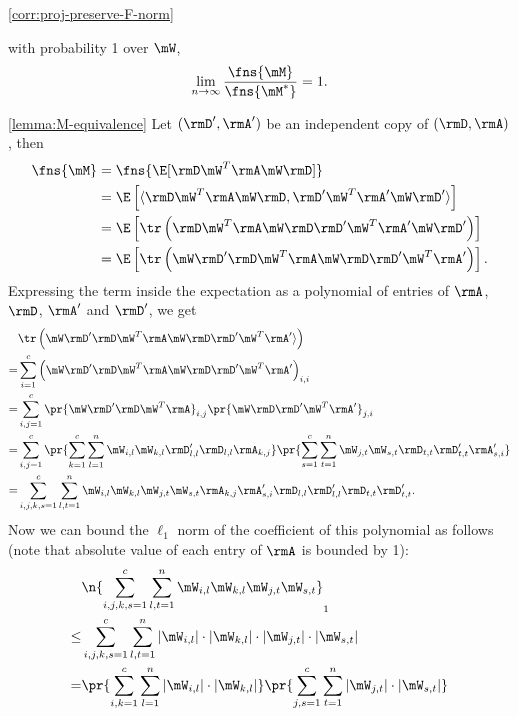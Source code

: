 \begin{proofof}{\cref{corr:proj-preserve-F-norm}}
\begin{lemma}
\label{lemma:M-equivalence} with probability 1 over $\mW$,
\[\lim_{n\to\infty}\frac{\fns{\mM}}{\fns{\mM^*}}=1.\]
\end{lemma}
\begin{proofof}{\cref{lemma:M-equivalence}}
Let $(\rmD',\rmA')$ be an independent copy of $(\rmD,\rmA)$, then
\begin{equation}
\begin{split}
    \fns{\mM} &=\fns{\E[\rmD\mW^T\rmA\mW\rmD]}\\
    &=\E\left[\langle \rmD\mW^T\rmA\mW\rmD,\rmD'\mW^T\rmA'\mW\rmD'\rangle\right]\\
    &=\E\left[\tr\left(\rmD\mW^T\rmA\mW\rmD\rmD'\mW^T\rmA'\mW\rmD'\right)\right]\\
    &=\E\left[\tr\left(\mW\rmD'\rmD\mW^T\rmA\mW\rmD\rmD'\mW^T\rmA'\right)\right].
\end{split}
\end{equation}
Expressing the term inside the expectation as a polynomial of entries of $\rmA$, $\rmD$, $\rmA'$ and $\rmD'$, we get
\begin{equation}
\begin{split}
     &\tr\left(\mW\rmD'\rmD\mW^T\rmA\mW\rmD\rmD'\mW^T\rmA'\rangle\right) \\
    =&\sum_{i=1}^c\left(\mW\rmD'\rmD\mW^T\rmA\mW\rmD\rmD'\mW^T\rmA'\right)_{i,i}\\
    =&\sum_{i,j=1}^c\pr{\mW\rmD'\rmD\mW^T\rmA}_{i,j}\pr{\mW\rmD\rmD'\mW^T\rmA'}_{j,i}\\
    =&\sum_{i,j=1}^c\pr{\sum_{k=1}^c\sum_{l=1}^n\mW_{i,l}\mW_{k,l}\rmD_{l,l}'\rmD_{l,l}\rmA_{k,j}}\pr{\sum_{s=1}^c\sum_{t=1}^n\mW_{j,t}\mW_{s,t}\rmD_{t,t}\rmD_{t,t}'\rmA_{s,i}'}\\
    =&\sum_{i,j,k,s=1}^c\sum_{l,t=1}^n \mW_{i,l}\mW_{k,l}\mW_{j,t}\mW_{s,t}\rmA_{k,j}\rmA_{s,i}'\rmD_{l,l}\rmD_{l,l}'\rmD_{t,t}\rmD_{t,t}'.
\end{split}
\end{equation}
Now we can bound the $\ell_1$ norm of the coefficient of this polynomial as follows (note that absolute value of each entry of $\rmA$ is bounded by 1):
\begin{equation}
\begin{split}
     &\n{\sum_{i,j,k,s=1}^c\sum_{l,t=1}^n \mW_{i,l}\mW_{k,l}\mW_{j,t}\mW_{s,t}}_1\\
    \leq &\sum_{i,j,k,s=1}^c\sum_{l,t=1}^n |\mW_{i,l}|\cdot|\mW_{k,l}|\cdot|\mW_{j,t}|\cdot|\mW_{s,t}|\\
    =    &\pr{\sum_{i,k=1}^c\sum_{l=1}^n|\mW_{i,l}|\cdot|\mW_{k,l}|}\pr{\sum_{j,s=1}^c\sum_{t=1}^n|\mW_{j,t}|\cdot|\mW_{s,t}|}\\

\end{split}
\end{equation}
\end{proofof}
\end{proofof}
